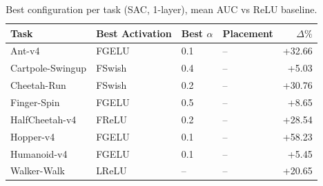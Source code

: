 \begin{table}[t]
\centering
\caption{Best configuration per task (SAC, 1-layer), mean AUC vs ReLU baseline.}
\label{tab:winner-sac-1-meanauc-relur}
\begin{tabular}{llllr}
\toprule
Task & Best Activation & Best $\alpha$ & Placement & $\Delta\%$ \\
\midrule
Ant-v4 & FGELU & 0.1 & -- & +32.66 \\
Cartpole-Swingup & FSwish & 0.4 & -- & +5.03 \\
Cheetah-Run & FSwish & 0.2 & -- & +30.76 \\
Finger-Spin & FGELU & 0.5 & -- & +8.65 \\
HalfCheetah-v4 & FReLU & 0.2 & -- & +28.54 \\
Hopper-v4 & FGELU & 0.1 & -- & +58.23 \\
Humanoid-v4 & FGELU & 0.1 & -- & +5.45 \\
Walker-Walk & LReLU & -- & -- & +20.65 \\
\bottomrule
\end{tabular}
\end{table}
